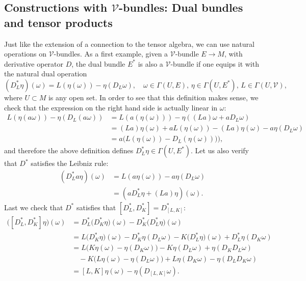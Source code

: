 \documentclass[11pt]{amsart}
\newcommand{\crb}{\mathcal{V}}
\theoremstyle{definition}
\theoremstyle{remark}
\theoremstyle{plain}
\begin{document}


%
%
\subsection{Constructions with $\mathcal{V}$-bundles: Dual bundles and tensor products} %
\label{sub:constructions_with_cr_bundles}
%
%
Just like the extension of a connection to the tensor algebra, we can 
use natural operations on $\mathcal{V}$-bundles. 
As a first example, given a $\mathcal{V}$-bundle $E \to M$, with derivative operator $D$, the dual 
bundle $E^*$ is also a $\mathcal{V}$-bundle if one equips it with the 
natural dual operation
%
\[ (D^*_{ L} \eta) (\omega) = 
 L (\eta (\omega)) - \eta (D_{L} \omega)  , \quad \omega \in \Gamma (U,E), 
\, \eta \in \Gamma (U,E^*), \, L \in \Gamma (U,\crb),
 \]
 where $U\subset M$ is any open set.
 In order to see that this 
 definition makes sense, we check  that the expression on the right hand side
 is actually linear in $\omega$: 
 \[ \begin{aligned}
 L  (\eta (a \omega)) - \eta (D_{ L}  (a \omega))  & =  {L} (a (\eta (\omega))) - 
 \eta ( ({L} a) \omega + a D_{L} \omega ) \\ 
 & =   ({L} a) \eta (\omega) + 
 a L (\eta (\omega)) - ({L} a) \eta ( \omega ) - a \eta( D_{L} \omega ) \\
 & =  a \big(L (\eta (\omega)) -  D_{L} (\eta (\omega)))\big),
 \end{aligned}
 \]
 and therefore the above definition defines $D^*_{L} \eta \in \Gamma (U, E^*)$. Let us also verify that $D^*$ satisfies the Leibniz rule: 
 \[ 
\begin{aligned}
(D^*_{L} a \eta) (\omega) &= 
 L (a \eta (\omega)) - a \eta (D_{L} \omega)  \\
&= ( a D^*_{L}  \eta + (L  a) \eta) (\omega).
\end{aligned}
 \]
 Last we check that $D^*$ satisfies
 that $[D^*_{L}, D^*_{K}] = D^*_{[L, K]} $:
 \begin{align*}
 \big([D_L^*, D_K^*]\eta \big)(\omega) &= D_L^*\big(D_K^*\eta\big)(\omega) - D_K^*\big(D_L^*\eta\big)(\omega) \\
 & = L\big(D_K^*\eta\big)(\omega) - D_K^*\eta(D_L\omega) -  K\big(D_L^*\eta\big)(\omega) +D_L^*\eta(D_K\omega)\\
 & = L\big(K\eta(\omega) - \eta(D_K\omega)\big) - K\eta(D_L\omega) + \eta(D_KD_L \omega)\\
 &\quad - K\big(L\eta(\omega) - \eta(D_L\omega)\big) + L\eta(D_K\omega) - \eta(D_LD_K \omega)\\
 & = [L,K]\eta(\omega) - \eta(D_{[L,K]}\omega).
 \end{align*}
\end{document}
